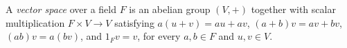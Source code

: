 
A \emph{vector space} over a field $F$ is an abelian group $(V,+)$ together with scalar multiplication $F\times V\to V$ satisfying $a(u+v)=au+av$, $(a+b)v=av+bv$, $(ab)v=a(bv)$, and $1_Fv=v$, for every $a,b\in F$ and $u,v\in V$.
